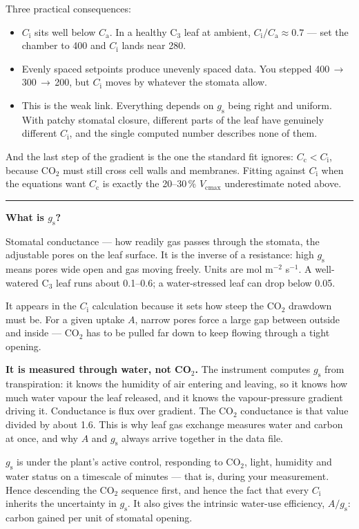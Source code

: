 \documentclass[11pt,letterpaper]{article}
\newcommand{\Vcmax}{\ensuremath{V_{\mathrm{cmax}}}}
\newcommand{\Ci}{\ensuremath{C_{\mathrm{i}}}}
\newcommand{\Ca}{\ensuremath{C_{\mathrm{a}}}}
\newcommand{\Cc}{\ensuremath{C_{\mathrm{c}}}}
\newcommand{\question}[1]{%
  \vspace{1.5em}%
  {\noindent\color{rulegray}\rule{\textwidth}{0.4pt}\par}%
  \vspace{0.7em}%
  {\noindent\color{accent}\bfseries #1\par}%
  \vspace{0.6em}%
}
\begin{document}
Three practical consequences:

\begin{itemize}
  \item \Ci{} sits well below \Ca{}. In a healthy C$_3$ leaf at ambient,
        $\Ci/\Ca \approx 0.7$ --- set the chamber to 400 and \Ci{} lands near
        280.
  \item Evenly spaced setpoints produce unevenly spaced data. You stepped
        400\,$\to$\,300\,$\to$\,200, but \Ci{} moves by whatever the stomata
        allow.
  \item This is the weak link. Everything depends on $g_{\mathrm{s}}$ being
        right and uniform. With patchy stomatal closure, different parts of the
        leaf have genuinely different \Ci{}, and the single computed number
        describes none of them.
\end{itemize}

And the last step of the gradient is the one the standard fit ignores: $\Cc <
\Ci$, because CO$_2$ must still cross cell walls and membranes. Fitting against
\Ci{} when the equations want \Cc{} is exactly the 20--30\,\% \Vcmax{}
underestimate noted above.

\question{What is $g_{\mathrm{s}}$?}

Stomatal conductance --- how readily gas passes through the stomata, the
adjustable pores on the leaf surface. It is the inverse of a resistance: high
$g_{\mathrm{s}}$ means pores wide open and gas moving freely. Units are mol
m$^{-2}$ s$^{-1}$. A well-watered C$_3$ leaf runs about 0.1--0.6; a
water-stressed leaf can drop below 0.05.

It appears in the \Ci{} calculation because it sets how steep the CO$_2$
drawdown must be. For a given uptake $A$, narrow pores force a large gap between
outside and inside --- CO$_2$ has to be pulled far down to keep flowing through
a tight opening.

\textbf{It is measured through water, not CO$_2$.} The instrument computes
$g_{\mathrm{s}}$ from transpiration: it knows the humidity of air entering and
leaving, so it knows how much water vapour the leaf released, and it knows the
vapour-pressure gradient driving it. Conductance is flux over gradient. The
CO$_2$ conductance is that value divided by about 1.6. This is why leaf gas
exchange measures water and carbon at once, and why $A$ and $g_{\mathrm{s}}$
always arrive together in the data file.

$g_{\mathrm{s}}$ is under the plant's active control, responding to CO$_2$,
light, humidity and water status on a timescale of minutes --- that is, during
your measurement. Hence descending the CO$_2$ sequence first, and hence the fact
that every \Ci{} inherits the uncertainty in $g_{\mathrm{s}}$. It also gives the
intrinsic water-use efficiency, $A/g_{\mathrm{s}}$: carbon gained per unit of
stomatal opening.
\end{document}
